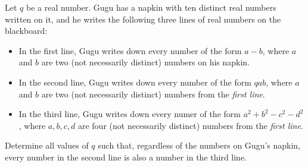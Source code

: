 Let $q$ be a real number. Gugu has a napkin with ten distinct real numbers written on it, and he writes the following three lines of real numbers on the blackboard:

\begin{itemize}
	\item In the first line, Gugu writes down every number of the form $a-b$, where $a$ and $b$ are two (not necessarily distinct) numbers on his napkin.
	\item In the second line, Gugu writes down every number of the form $qab$, where $a$ and $b$ are two (not necessarily distinct) numbers from the \emph{first line}.
	\item In the third line, Gugu writes down every numer of the form $a^2+b^2-c^2-d^2$, where $a,b,c,d$ are four (not necessarily distinct) numbers from the \emph{first line}.
\end{itemize}

Determine all values of $q$ such that, regardless of the numbers on Gugu's napkin, every number in the second line is also a number in the third line.